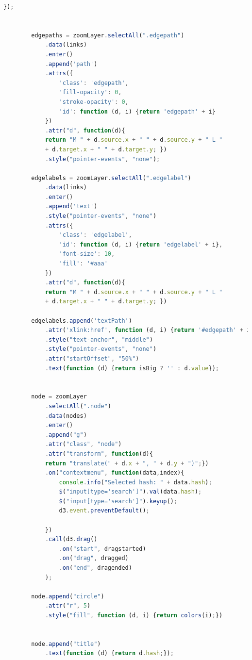 \begin{itemize}
\begin{lstlisting}[language=Javascript, label=lst:makeGraph, caption={Funzione per grafi.}]
            });


        edgepaths = zoomLayer.selectAll(".edgepath")
            .data(links)
            .enter()
            .append('path')
            .attrs({
                'class': 'edgepath',
                'fill-opacity': 0,
                'stroke-opacity': 0,
                'id': function (d, i) {return 'edgepath' + i}
            })
            .attr("d", function(d){ 
            return "M " + d.source.x + " " + d.source.y + " L " 
            + d.target.x + " " + d.target.y; })
            .style("pointer-events", "none");

        edgelabels = zoomLayer.selectAll(".edgelabel")
            .data(links)
            .enter()
            .append('text')
            .style("pointer-events", "none")
            .attrs({
                'class': 'edgelabel',
                'id': function (d, i) {return 'edgelabel' + i},
                'font-size': 10,
                'fill': '#aaa'
            })
            .attr("d", function(d){ 
            return "M " + d.source.x + " " + d.source.y + " L " 
            + d.target.x + " " + d.target.y; })

        edgelabels.append('textPath')
            .attr('xlink:href', function (d, i) {return '#edgepath' + i})
            .style("text-anchor", "middle")
            .style("pointer-events", "none")
            .attr("startOffset", "50%")
            .text(function (d) {return isBig ? '' : d.value});


        node = zoomLayer
            .selectAll(".node")
            .data(nodes)
            .enter()
            .append("g")
            .attr("class", "node")
            .attr("transform", function(d){ 
            return "translate(" + d.x + ", " + d.y + ")";})
            .on("contextmenu", function(data,index){
                console.info("Selected hash: " + data.hash);
                $("input[type='search']").val(data.hash);
                $("input[type='search']").keyup();
                d3.event.preventDefault();

            })
            .call(d3.drag()
                .on("start", dragstarted)
                .on("drag", dragged)
                .on("end", dragended)
            );

        node.append("circle")
            .attr("r", 5)
            .style("fill", function (d, i) {return colors(i);})


        node.append("title")
            .text(function (d) {return d.hash;});


\end{lstlisting}
\end{itemize}
